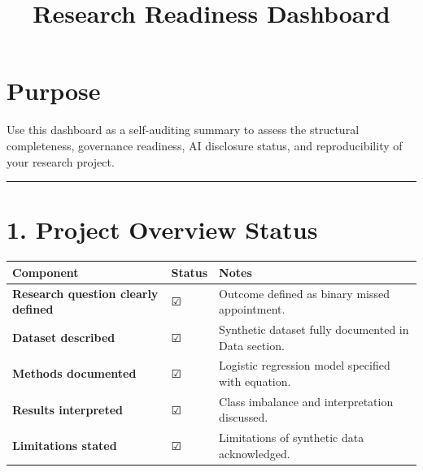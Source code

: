 \documentclass[
]{report}
\title{Research Readiness Dashboard}
\author{}
\date{}
\renewcommand*\contentsname{Table of contents}
\newcommand\contentsname{Table of contents}
\begin{document}
\maketitle

\renewcommand*\contentsname{Table of contents}
{
\hypersetup{linkcolor=}
\setcounter{tocdepth}{2}
\tableofcontents
}

\chapter{Purpose}\label{purpose}

Use this dashboard as a self-auditing summary to assess the structural
completeness, governance readiness, AI disclosure status, and
reproducibility of your research project.

\begin{center}\rule{0.5\linewidth}{0.5pt}\end{center}

\chapter{1. Project Overview Status}\label{project-overview-status}

\begin{longtable}[]{@{}
  >{\raggedright\arraybackslash}p{}
  >{\raggedright\arraybackslash}p{}
  >{\raggedright\arraybackslash}p{}@{}}
\toprule\noalign{}
\begin{minipage}[b]{\linewidth}\raggedright
Component
\end{minipage} & \begin{minipage}[b]{\linewidth}\raggedright
Status
\end{minipage} & \begin{minipage}[b]{\linewidth}\raggedright
Notes
\end{minipage} \\
\midrule\noalign{}
\endhead
\bottomrule\noalign{}
\endlastfoot
\textbf{Research question clearly defined} & ☑ & Outcome defined as
binary missed appointment. \\
\textbf{Dataset described} & ☑ & Synthetic dataset fully documented in
Data section. \\
\textbf{Methods documented} & ☑ & Logistic regression model specified
with equation. \\
\textbf{Results interpreted} & ☑ & Class imbalance and interpretation
discussed. \\
\textbf{Limitations stated} & ☑ & Limitations of synthetic data
acknowledged. \\
\end{longtable}
\end{document}
